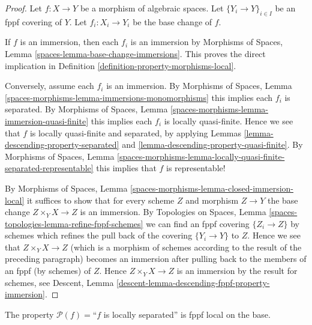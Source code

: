 \begin{proof}
Let $f : X \to Y$ be a morphism of algebraic spaces.
Let $\{Y_i \to Y\}_{i \in I}$ be an fppf covering of $Y$.
Let $f_i : X_i \to Y_i$ be the base change of $f$.

\medskip\noindent
If $f$ is an immersion, then each $f_i$ is an immersion by
Morphisms of Spaces,
Lemma \ref{spaces-lemma-base-change-immersions}.
This proves the direct implication in
Definition \ref{definition-property-morphisms-local}.

\medskip\noindent
Conversely, assume each $f_i$ is an immersion. By
Morphisms of Spaces,
Lemma \ref{spaces-morphisms-lemma-immersions-monomorphisms}
this implies each $f_i$ is separated. By
Morphisms of Spaces,
Lemma \ref{spaces-morphisms-lemma-immersion-quasi-finite}
this implies each $f_i$ is locally quasi-finite.
Hence we see that $f$ is locally quasi-finite and separated, by applying
Lemmas \ref{lemma-descending-property-separated}
and \ref{lemma-descending-property-quasi-finite}.
By
Morphisms of Spaces, Lemma
\ref{spaces-morphisms-lemma-locally-quasi-finite-separated-representable}
this implies that $f$ is representable!

\medskip\noindent
By
Morphisms of Spaces, Lemma \ref{spaces-morphisms-lemma-closed-immersion-local}
it suffices to show that for every scheme $Z$ and morphism $Z \to Y$
the base change $Z \times_Y X \to Z$ is an immersion. By
Topologies on Spaces, Lemma \ref{spaces-topologies-lemma-refine-fppf-schemes}
we can find an fppf covering $\{Z_i \to Z\}$ by schemes which refines
the pull back of the covering $\{Y_i \to Y\}$ to $Z$.
Hence we see that $Z \times_Y X \to Z$ (which is a morphism of schemes
according to the result of the preceding paragraph) becomes an immersion
after pulling back to the members of an fppf (by schemes) of $Z$.
Hence $Z \times_Y X \to Z$ is an immersion by the result for schemes, see
Descent, Lemma \ref{descent-lemma-descending-fppf-property-immersion}.
\end{proof}

\begin{lemma}
\label{lemma-descending-fppf-property-locally-separated}
The property $\mathcal{P}(f) =$``$f$ is locally separated''
is fppf local on the base.
\end{lemma}

